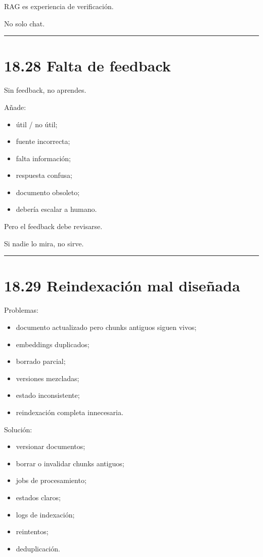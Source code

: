 RAG es experiencia de verificación.

No solo chat.

\begin{center}\rule{0.5\linewidth}{0.5pt}\end{center}

\section{18.28 Falta de feedback}\label{falta-de-feedback}

Sin feedback, no aprendes.

Añade:

\begin{itemize}
\tightlist
\item
  útil / no útil;
\item
  fuente incorrecta;
\item
  falta información;
\item
  respuesta confusa;
\item
  documento obsoleto;
\item
  debería escalar a humano.
\end{itemize}

Pero el feedback debe revisarse.

Si nadie lo mira, no sirve.

\begin{center}\rule{0.5\linewidth}{0.5pt}\end{center}

\section{18.29 Reindexación mal
diseñada}\label{reindexaciuxf3n-mal-diseuxf1ada}

Problemas:

\begin{itemize}
\tightlist
\item
  documento actualizado pero chunks antiguos siguen vivos;
\item
  embeddings duplicados;
\item
  borrado parcial;
\item
  versiones mezcladas;
\item
  estado inconsistente;
\item
  reindexación completa innecesaria.
\end{itemize}

Solución:

\begin{itemize}
\tightlist
\item
  versionar documentos;
\item
  borrar o invalidar chunks antiguos;
\item
  jobs de procesamiento;
\item
  estados claros;
\item
  logs de indexación;
\item
  reintentos;
\item
  deduplicación.
\end{itemize}

